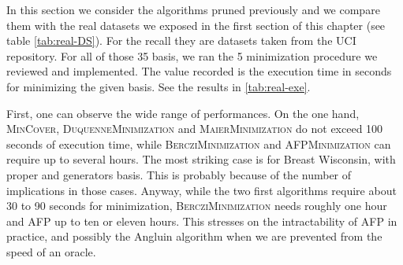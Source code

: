 In this section we consider the algorithms pruned previously and we compare them
with the real datasets we exposed in the first section of this chapter (see table \ref{tab:real-DS}). For the recall they are datasets taken from the UCI 
repository. For all of those 35 basis, we ran the 5 minimization procedure
we reviewed and implemented. The value recorded is the execution time in seconds
for minimizing the given basis. See the results in \ref{tab:real-exe}.

\vspace{1.2em}

First, one can observe the wide range of performances. On the one hand,
\textsc{MinCover}, \textsc{DuquenneMinimization}  and \textsc{MaierMinimization} do not exceed 100 seconds of execution time, while \textsc{BercziMinimization} and \textsc{AFPMinimization} can require up to several hours. The most striking case is for Breast Wisconsin, with proper and generators basis. This is probably because of the number of implications in those cases. Anyway, while the two first algorithms require about 30 to 90 seconds for minimization, \textsc{BercziMinimization} needs roughly one hour and \textsc{AFP} up to ten or eleven hours. This stresses on the intractability of \textsc{AFP} in practice, and possibly the Angluin algorithm when we are prevented from the speed of an oracle.

\vspace{1.2em}

